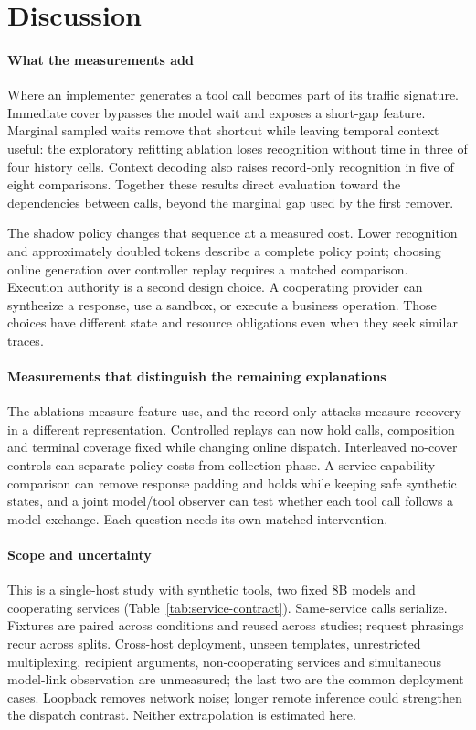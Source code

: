 \section{Discussion}\label{sec:discussion}
\paragraph{What the measurements add}
Where an implementer generates a tool call becomes part of its traffic signature. Immediate cover bypasses the model wait and exposes a short-gap feature. Marginal sampled waits remove that shortcut while leaving temporal context useful: the exploratory refitting ablation loses recognition without time in three of four history cells. Context decoding also raises record-only recognition in five of eight comparisons. Together these results direct evaluation toward the dependencies between calls, beyond the marginal gap used by the first remover.

The shadow policy changes that sequence at a measured cost. Lower recognition and approximately doubled tokens describe a complete policy point; choosing online generation over controller replay requires a matched comparison. Execution authority is a second design choice. A cooperating provider can synthesize a response, use a sandbox, or execute a business operation. Those choices have different state and resource obligations even when they seek similar traces.

\paragraph{Measurements that distinguish the remaining explanations}
The ablations measure feature use, and the record-only attacks measure recovery in a different representation. Controlled replays can now hold calls, composition and terminal coverage fixed while changing online dispatch. Interleaved no-cover controls can separate policy costs from collection phase. A service-capability comparison can remove response padding and holds while keeping safe synthetic states, and a joint model/tool observer can test whether each tool call follows a model exchange. Each question needs its own matched intervention.

\paragraph{Scope and uncertainty}\label{sec:limits}
This is a single-host study with synthetic tools, two fixed 8B models and cooperating services (Table~\ref{tab:service-contract}). Same-service calls serialize. Fixtures are paired across conditions and reused across studies; request phrasings recur across splits. Cross-host deployment, unseen templates, unrestricted multiplexing, recipient arguments, non-cooperating services and simultaneous model-link observation are unmeasured; the last two are the common deployment cases. Loopback removes network noise; longer remote inference could strengthen the dispatch contrast. Neither extrapolation is estimated here.

